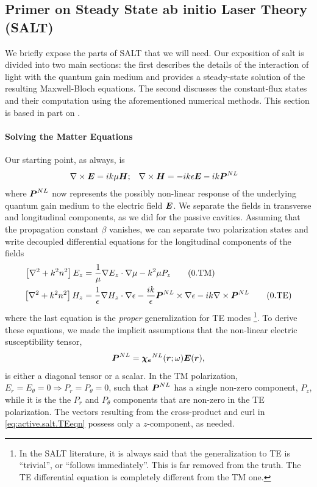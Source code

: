 \subsection{Primer on Steady State ab initio Laser Theory (SALT)}
We briefly expose the parts of SALT that we will need.
Our exposition of \gls{salt} is divided into two main sections:
the first describes the details of the interaction of light with
the quantum gain medium and provides a steady-state solution
of the resulting Maxwell-Bloch equations. The second
discusses the constant-flux states and their computation
using the aforementioned numerical methods. This section is based
in part on \cite{GE2010a,GE2010b,CHO2012}.

\paragraph{Solving the Matter Equations}
Our starting point, as always, is
  \begin{align}
   \nabla\times\boldsymbol{E}	&= ik\mu\boldsymbol{H};	&	\nabla\times\boldsymbol{H}	&= -ik\epsilon\boldsymbol{E}-ik\boldsymbol{P}^{NL}
  \end{align}
where $\boldsymbol{P}^{NL}$ now represents the possibly non-linear response
of the underlying quantum gain medium to the electric field $\boldsymbol{E}$.
We separate the fields in transverse and longitudinal
components, as we did for the passive cavities. Assuming 
that the propagation constant $\beta$ vanishes, we can 
separate two polarization states and write decoupled differential
equations for the longitudinal components of the fields
	\begin{subequations}
	\begin{align}
		\left[\nabla^2+k^2n^2\right]E_z	&= \frac{1}{\mu}\nabla E_z\cdot\nabla\mu -k^2\mu P_z	\tag{\theequation.TM}\\
		\left[\nabla^2+k^2n^2\right]H_z	&= \frac{1}{\epsilon}\nabla H_z\cdot\nabla\epsilon-
											\frac{ik}{\epsilon}\boldsymbol{P}^{NL}\times\nabla\epsilon
											-ik\nabla\times\boldsymbol{P}^{NL}							\tag{\theequation.TE}\label{eq:active.salt.TEeqn}
	\end{align}
	\end{subequations}
where the last equation is the \textit{proper} generalization for TE modes
\footnote{In the SALT literature, it is always said that the generalization
to TE is ``trivial'', or ``follows immediately''. This is far removed from
the truth. The TE differential equation is completely different from the
TM one.}. 
To derive these equations, we made the implicit assumptions that the 
non-linear electric susceptibility tensor, 
	\begin{equation}
		\boldsymbol{P}^{NL} = \boldsymbol{\chi_e}^{NL}(\boldsymbol{r};\omega)\boldsymbol{E}(\boldsymbol{r}),
	\end{equation}
is either a diagonal tensor or a scalar. In the TM polarization, 
$E_r=E_\theta=0\Rightarrow P_r=P_\theta=0$, such that $\boldsymbol{P}^{NL}$
has a single non-zero component, $P_z$, while it is the
the $P_r$ and $P_\theta$ components that are non-zero in the TE polarization. The vectors resulting
from the cross-product and curl in \eqref{eq:active.salt.TEeqn} possess
only a $z$-component, as needed. 

